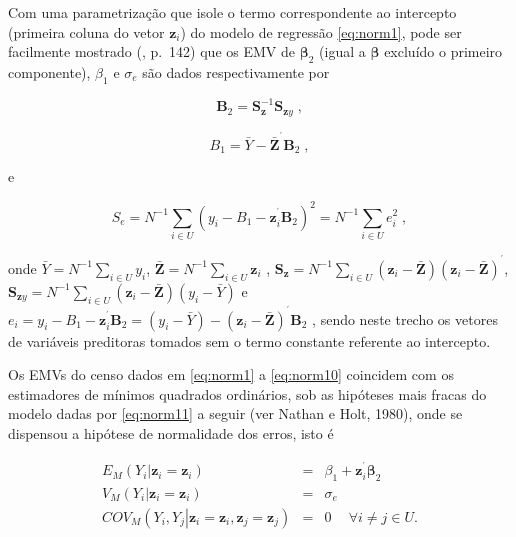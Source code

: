 \documentclass[]{book}
\numberwithin{example}{chapter}
\numberwithin{remark}{chapter}
\numberwithin{definition}{chapter}
\begin{document}
Com uma parametrização que isole o termo correspondente ao intercepto
(primeira coluna do vetor \(\mathbf{z}_{i}\)) do modelo de regressão
\eqref{eq:norm1}, pode ser facilmente mostrado (\citep{Silva}, p.~142) que
os EMV de \(\mathbf{\beta }_{2}\) (igual a \(\mathbf{\beta }\) excluído
o primeiro componente), \(\beta _{1}\) e \(\sigma _{e}\) são dados
respectivamente por

\begin{equation}
\mathbf{B}_{2}=\mathbf{S}_{\mathbf{z}}^{-1}\mathbf{S}_{\mathbf{z}y}\;,
\label{eq:norm8}
\end{equation}

\begin{equation}
B_{1}=\bar{Y}-\mathbf{\bar{Z}}^{^{\prime }}\mathbf{B}_{2}\mathbf{\;,}
\label{eq:norm9}
\end{equation}

e

\begin{equation}
S_{e}=N^{-1}\sum\limits_{i\in U}\left( y_{i}-B_{1}-\mathbf{z}_{i}^{^{\prime
}}\mathbf{B}_{2}\right) ^{2}=N^{-1}\sum\limits_{i\in U}e_{i}^{2}\;,
\label{eq:norm10}
\end{equation}

onde \(\bar{Y}=N^{-1}\sum\limits_{i\in U}y_{i}\),
\(\mathbf{\bar{Z}}=N^{-1}\sum\limits_{i\in U}\mathbf{z}_{i}\) ,
\(\mathbf{S}_{\mathbf{z}}=N^{-1}\sum\limits_{i\in U}\left( \mathbf{z}_{i}-\mathbf{\bar{Z}}\right)\left( \mathbf{z}_{i}-\mathbf{\bar{Z}}\right) ^{^{\prime }}\),
\(\mathbf{S}_{ \mathbf{z}y}=N^{-1}\sum\limits_{i\in U}\left( \mathbf{z}_{i}-\mathbf{\bar{Z}}\right) \left( y_{i}-\bar{Y}\right)\)
e
\(e_{i}=y_{i}-B_{1}-\mathbf{z}_{i}^{^{\prime }}\mathbf{B}_{2}=\left( y_{i}-\bar{Y}\right) -\left( \mathbf{z}_{i}-\mathbf{\bar{Z}}\right) ^{^{\prime }}\mathbf{B}_{2}\)
, sendo neste trecho os vetores de variáveis preditoras tomados sem o
termo constante referente ao intercepto.

Os EMVs do censo dados em \eqref{eq:norm1} a \eqref{eq:norm10} coincidem com
os estimadores de mínimos quadrados ordinários, sob as hipóteses mais
fracas do modelo dadas por \eqref{eq:norm11} a seguir (ver Nathan e Holt,
1980), onde se dispensou a hipótese de normalidade dos erros, isto é

\begin{eqnarray}
E_{M}\left( \left. Y_{i}\right| \mathbf{z}_{i}=\mathbf{z}_{i}\right)
&=&\beta _{1}+\mathbf{z}_{i}^{^{\prime }}\mathbf{\beta }_{2}  \label{eq:norm11} \\
V_{M}\left( \left. Y_{i}\right| \mathbf{z}_{i}=\mathbf{z}_{i}\right)
&=&\sigma _{e}  \nonumber \\
COV_{M}\left( \left. Y_{i},Y_{j}\right| \mathbf{z}_{i}=\mathbf{z}_{i},
\mathbf{z}_{j}=\mathbf{z}_{j}\right) &=&0\ \quad \forall i\neq j\in U. 
\nonumber
\end{eqnarray}
\end{document}
